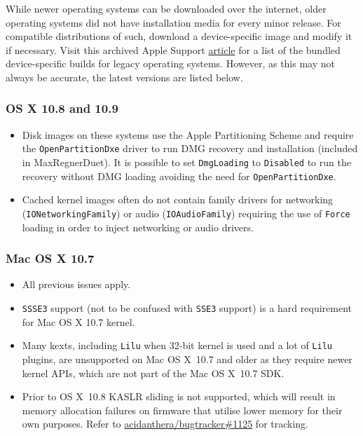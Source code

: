 \documentclass[]{article}
\begin{document}
While newer operating systems can be downloaded over the internet,
older operating systems did not have installation media for every minor
release. For compatible distributions of such, download a device-specific
image and modify it if necessary. Visit this archived Apple Support
\href{https://web.archive.org/web/20170705003629/https://support.apple.com/en-us/HT204319}{article}
for a list of the bundled device-specific builds for legacy operating systems.
However, as this may not always be accurate, the latest versions are listed below.

\subsubsection{OS X 10.8 and 10.9}\label{legacy108}

\begin{itemize}
  \item Disk images on these systems use the Apple Partitioning Scheme
    and require the \texttt{OpenPartitionDxe} driver to run DMG recovery
    and installation (included in MaxRegnerDuet). It is possible to set
    \texttt{DmgLoading} to \texttt{Disabled} to run the recovery
    without DMG loading avoiding the need for \texttt{OpenPartitionDxe}.
  \item Cached kernel images often do not contain family drivers
    for networking (\texttt{IONetworkingFamily}) or audio
    (\texttt{IOAudioFamily}) requiring the use of \texttt{Force}
    loading in order to inject networking or audio drivers.
\end{itemize}

\subsubsection{Mac OS X 10.7}\label{legacy107}

\begin{itemize}
  \item All previous issues apply.
  \item \texttt{SSSE3} support (not to be confused with \texttt{SSE3} support)
    is a hard requirement for Mac OS X 10.7 kernel.
  \item Many kexts, including \texttt{Lilu} when 32-bit kernel
    is used and a lot of \texttt{Lilu} plugins, are
    unsupported on Mac OS X~10.7 and older as they require newer
    kernel APIs, which are not part of the Mac OS X~10.7 SDK.
  \item Prior to OS X~10.8 KASLR sliding is not supported, which
    will result in memory allocation failures on firmware
    that utilise lower memory for their own purposes. Refer to
    \href{https://github.com/acidanthera/bugtracker/issues/1125}{acidanthera/bugtracker\#1125}
    for tracking.
\end{itemize}
\end{document}
